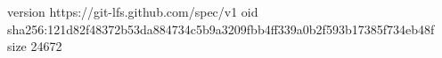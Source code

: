 version https://git-lfs.github.com/spec/v1
oid sha256:121d82f48372b53da884734c5b9a3209fbb4ff339a0b2f593b17385f734eb48f
size 24672
